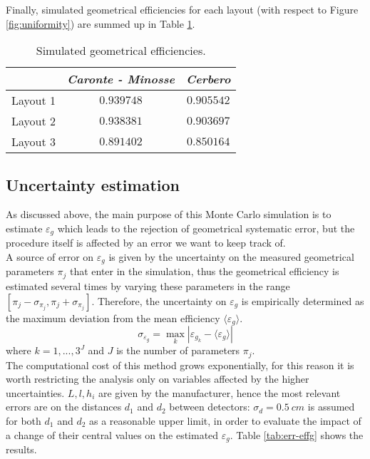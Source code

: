 Finally, simulated geometrical efficiencies for each layout (with respect to Figure \ref{fig:uniformity}) are summed up in Table \ref{tab:all-effg}.

\begin{table}[!hbp]
	\centering
	\begin{tabular}{r|cc}
	\toprule
	&\emph{Caronte - Minosse} & \emph{Cerbero}\\
	\midrule
	Layout 1 & $0.939748$ & $0.905542$\\
	Layout 2 & $0.938381$ & $0.903697$\\ 
	Layout 3 & $0.891402$ & $0.850164$\\
	\bottomrule
	\end{tabular}
	\caption{Simulated geometrical efficiencies.}\label{tab:all-effg}
\end{table}

\subsection{Uncertainty estimation}

As discussed above, the main purpose of this Monte Carlo simulation is to estimate $\varepsilon_{g}$ which leads to the rejection of geometrical systematic error, but the procedure itself is affected by an error we want to keep track of.\\

A source of error on $\varepsilon_{g}$ is given by the uncertainty on the measured geometrical parameters $\pi_j$ that enter in the simulation, thus the geometrical efficiency is estimated several times by varying these parameters in the range $\left[\pi_j-\sigma_{\pi_{j}}, \pi_j+\sigma_{\pi_{j}} \right]$. Therefore, the uncertainty on $\varepsilon_{g}$ is empirically determined as the maximum deviation from the mean efficiency $\langle\varepsilon_{g}\rangle$.\\
\begin{equation}
\sigma_{\varepsilon_{g}}=\max_k\left|\varepsilon_{g_k}  -\langle\varepsilon_{g}\rangle\right|
\end{equation}
where $k=1, ..., 3^J$ and $J$ is the number of parameters $\pi_j$.\\

The computational cost of this method grows exponentially, for this reason it is worth restricting the analysis only on variables affected by the higher uncertainties. $L,l, h_i$ are given by the manufacturer, hence the most relevant errors are on the distances $d_1$ and $d_2$ between detectors: $\sigma_d=\SI{0.5}{cm}$ is assumed for both $d_1$ and $d_2$ as a reasonable upper limit, in order to evaluate the impact of a change of their central values on the estimated $\varepsilon_{g}$. Table \ref{tab:err-effg} shows the results.

